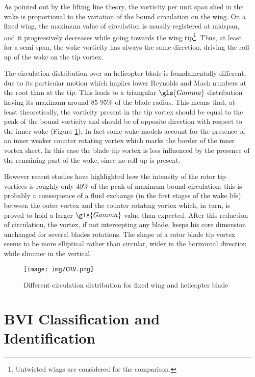 As pointed out by the lifting line theory, the vorticity per unit span shed in the wake is proportional to the variation of the bound circulation on the wing. On a fixed wing, the maximum value of circulation is usually registered at midspan, and it progressively decreases while going towards the wing tip\footnote{Untwisted wings are considered for the comparison.}. Thus, at least for a semi span, the wake vorticity has always the same direction, driving the roll up of the wake on the tip vortex. 

The circulation distribution over an helicopter blade is foundamentally different, due to its particular motion which implies lower Reynolds and Mach numbers at the root than at the tip. This leads to a triangular $\gls{Gamma}$ distribution having its maximum around 85-95\% of the blade radius. This means that, at least theoretically, the vorticity present in the tip vortex should be equal to the peak of the bound vorticity and should be of opposite direction with respect to the inner wake (Figure \ref{CRV}). In fact some wake models account for the presence of an inner weaker counter rotating vortex which marks the border of the inner vortex sheet. In this case the blade tip vortex is less influenced by the presence of the remaining part of the wake, since no roll up is present. 

However recent studies have highlighted how the intensity of the rotor tip vortices is roughly only 40\% of the peak of maximum bound circulation; this is probably a consequence of a fluid exchange (in the first stages of the wake life) between the outer vortex and the counter rotating vortex which, in turn, is proved to hold a larger $\gls{Gamma}$ value than expected. After this reduction of circulation, the vortex, if not intercepting any blade, keeps his core dimension unchanged for several blades rotations. The shape of a rotor blade tip vortex seems to be more elliptical rather than circular, wider in the horizontal direction while slimmer in the vertical.


\begin{figure}
	\centering
	\texttt{[image: img/CRV.png]}
	\caption{Different circulation distribution for fixed wing and helicopter blade}
	\label{CRV}
\end{figure}


\section{BVI Classification and Identification}

